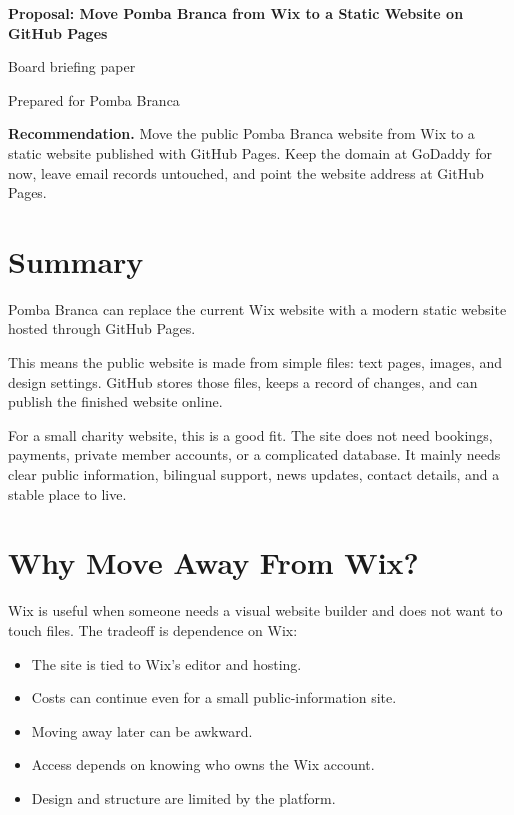 \documentclass[10pt]{article}
\newcommand{\sectionrule}{\vspace{-0.45em}{\color{PombaBlue}\hrule height 0.8pt}\vspace{0.55em}}
\begin{document}
\begin{center}
  {\color{PombaBlue}\LARGE\bfseries Proposal: Move Pomba Branca from Wix to a Static Website on GitHub Pages}

  \vspace{0.6em}
  {\large Board briefing paper}

  \vspace{0.35em}
  {\small Prepared for Pomba Branca}
\end{center}

\vspace{0.75em}

\colorbox{SoftBlue}{
  \begin{minipage}{0.94\linewidth}
  \textbf{Recommendation.}
  Move the public Pomba Branca website from Wix to a static website published with GitHub Pages. Keep the domain at GoDaddy for now, leave email records untouched, and point the website address at GitHub Pages.
  \end{minipage}
}

\section*{Summary}
\sectionrule

Pomba Branca can replace the current Wix website with a modern static website hosted through GitHub Pages.

This means the public website is made from simple files: text pages, images, and design settings. GitHub stores those files, keeps a record of changes, and can publish the finished website online.

For a small charity website, this is a good fit. The site does not need bookings, payments, private member accounts, or a complicated database. It mainly needs clear public information, bilingual support, news updates, contact details, and a stable place to live.

\section*{Why Move Away From Wix?}
\sectionrule

Wix is useful when someone needs a visual website builder and does not want to touch files. The tradeoff is dependence on Wix:

\begin{itemize}
  \item The site is tied to Wix's editor and hosting.
  \item Costs can continue even for a small public-information site.
  \item Moving away later can be awkward.
  \item Access depends on knowing who owns the Wix account.
  \item Design and structure are limited by the platform.
\end{itemize}
\end{document}
